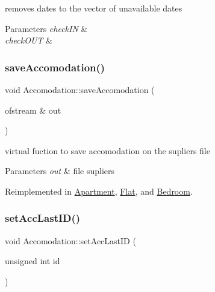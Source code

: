 removes dates to the vector of unavailable dates 


\begin{DoxyParams}{Parameters}
{\em check\+IN} & \\
\hline
{\em check\+O\+UT} & \\
\hline
\end{DoxyParams}
\hypertarget{class_accomodation_a4394eb907b2d5a23faf73dd03c1dac4d}{}\label{class_accomodation_a4394eb907b2d5a23faf73dd03c1dac4d} 
\subsubsection{\texorpdfstring{save\+Accomodation()}{saveAccomodation()}}
{\footnotesize\ttfamily void Accomodation\+::save\+Accomodation (\begin{DoxyParamCaption}\item[{ofstream \&}]{out }\end{DoxyParamCaption})\hspace{0.3cm}{\ttfamily [virtual]}}



virtual fuction to save accomodation on the supliers file 


\begin{DoxyParams}{Parameters}
{\em out} & file supliers \\
\hline
\end{DoxyParams}


Reimplemented in \hyperlink{class_apartment_af30f7fa6ee2877315b553614dcfad9f2}{Apartment}, \hyperlink{class_flat_a9569fe297d02edebfe67d62125a86696}{Flat}, and \hyperlink{class_bedroom_ad5d0a12fe0257ba5c14efc6182ee33ce}{Bedroom}.

\hypertarget{class_accomodation_a5554cdc8b46ae1fb92c94bf4696f9b77}{}\label{class_accomodation_a5554cdc8b46ae1fb92c94bf4696f9b77} 
\subsubsection{\texorpdfstring{set\+Acc\+Last\+I\+D()}{setAccLastID()}}
{\footnotesize\ttfamily void Accomodation\+::set\+Acc\+Last\+ID (\begin{DoxyParamCaption}\item[{unsigned int}]{id }\end{DoxyParamCaption})\hspace{0.3cm}{\ttfamily [static]}}



